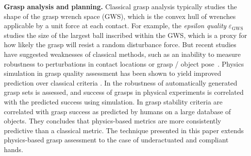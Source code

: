 
{\bf Grasp analysis and planning.}  
Classical grasp analysis typically studies the shape of the grasp wrench space (GWS), which is the convex hull of wrenches applicable by a unit force at each contact. For example, the {\emph{epsilon quality} $\varepsilon_{\text{GWS}}$} \cite{Ferrari92, Pokorny13c} studies the size of the largest ball inscribed within the GWS, which is a proxy for how likely the grasp will resist a random  disturbance force. 
But recent studies have suggested weaknesses of classical methods, such as an inability to measure robustness to perturbations in contact locations or grasp / object pose~\cite{Weisz12}. 
Physics simulation in grasp quality assessment has been shown to yield improved prediction over classical criteria \cite{Kappler15,JunggonKim13}.  In \cite{JunggonKim13} the robustness of automatically generated grasp sets is assessed, and success of grasps in physical experiments is correlated with the predicted success using simulation. 
In \cite{Kappler15} grasp stability criteria are correlated with grasp success as predicted by humans on a large database of objects. They concludes that physics-based metrics are more consistently predictive than a classical metric. %
The technique presented in this paper extends physics-based grasp assessment to the case of underactuated and compliant hands.



